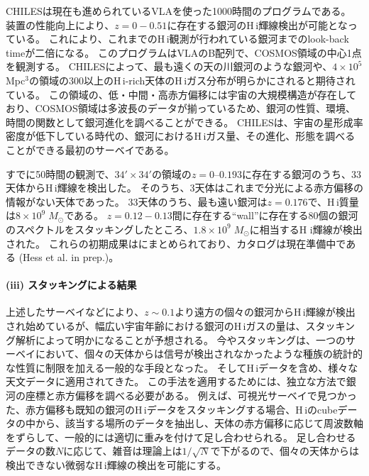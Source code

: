 CHILESは現在も進められているVLAを使った1000時間のプログラムである。
装置の性能向上により、$z=0-0.51$に存在する銀河のH\,{\sc i}輝線検出が可能となっている。
これにより、これまでのH\,{\sc i}観測が行われている銀河までのlook-back timeが二倍になる。
このプログラムはVLAのB配列で、COSMOS領域の中心1点を観測する。
CHILESによって、最も遠くの天の川銀河のような銀河や、$4\times10^5$ Mpc$^3$の領域の300以上のH\,{\sc i}-rich天体のH\,{\sc i}ガス分布が明らかにされると期待されている。
この領域の、低・中間・高赤方偏移には宇宙の大規模構造が存在しており、COSMOS領域は多波長のデータが揃っているため、銀河の性質、環境、時間の関数として銀河進化を調べることができる。
CHILESは、宇宙の星形成率密度が低下している時代の、銀河におけるH\,{\sc i}ガス量、その進化、形態を調べることができる最初のサーベイである。

すでに50時間の観測で、$34'\times34'$の領域の$z=0\mbox{--}0.193$に存在する銀河のうち、33天体からH\,{\sc i}輝線を検出した。
そのうち、3天体はこれまで分光による赤方偏移の情報がない天体であった。
33天体のうち、最も遠い銀河は$z=0.176$で、H\,{\sc i}質量は$8\times10^9\; M_\odot$である。
$z=0.12-0.13$間に存在する``wall''に存在する80個の銀河のスペクトルをスタッキングしたところ、$1.8\times10^9\;  M_\odot$に相当するH {\sc i}輝線が検出された。
これらの初期成果は\citet{2013ApJ...770L..29F}にまとめられており、カタログは現在準備中である (Hess et al. in prep.)。

\paragraph{(iii) スタッキングによる結果}

上述したサーベイなどにより、$z\sim0.1$より遠方の個々の銀河からH\,{\sc i}輝線が検出され始めているが、幅広い宇宙年齢における銀河のH\,{\sc i}ガスの量は、スタッキング解析によって明かになることが予想される。
今やスタッキングは、一つのサーベイにおいて、個々の天体からは信号が検出されなかったような種族の統計的な性質に制限を加える一般的な手段となった。
そしてH\,{\sc i}データを含め、様々な天文データに適用されてきた。
この手法を適用するためには、独立な方法で銀河の座標と赤方偏移を調べる必要がある。
例えば、可視光サーベイで見つかった、赤方偏移も既知の銀河のH\,{\sc i}データをスタッキングする場合、H\,{\sc i}のcubeデータの中から、該当する場所のデータを抽出し、天体の赤方偏移に応じて周波数軸をずらして、一般的には適切に重みを付けて足し合わせられる。
足し合わせるデータの数$N$に応じて、雑音は理論上は$1/\sqrt{N}$で下がるので、個々の天体からは検出できない微弱なH\,{\sc i}輝線の検出を可能にする。


